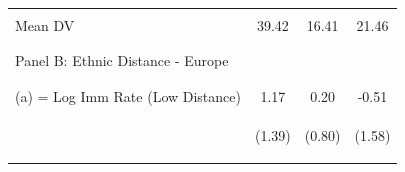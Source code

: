 \begin{center}
\begin{tabular}{lccc}
 & \begin{footnotesize}\end{footnotesize} & \begin{footnotesize}\end{footnotesize} & \begin{footnotesize}\end{footnotesize}\\
\noalign{\smallskip}Mean DV & 39.42 & 16.41 & 21.46\\
 & \begin{footnotesize}\end{footnotesize} & \begin{footnotesize}\end{footnotesize} & \begin{footnotesize}\end{footnotesize}\\
 & \begin{footnotesize}\end{footnotesize} & \begin{footnotesize}\end{footnotesize} & \begin{footnotesize}\end{footnotesize}\\
\noalign{\smallskip}Panel B: Ethnic Distance - Europe &  &  & \\
 & \begin{footnotesize}\end{footnotesize} & \begin{footnotesize}\end{footnotesize} & \begin{footnotesize}\end{footnotesize}\\
 & \begin{footnotesize}\end{footnotesize} & \begin{footnotesize}\end{footnotesize} & \begin{footnotesize}\end{footnotesize}\\
\noalign{\smallskip}(a) = Log Imm Rate (Low Distance) & 1.17 & 0.20 & -0.51\\
 & \begin{footnotesize}(1.39)\end{footnotesize} & \begin{footnotesize}(0.80)\end{footnotesize} & \begin{footnotesize}(1.58)\end{footnotesize}\\

\end{tabular}
\end{center}
